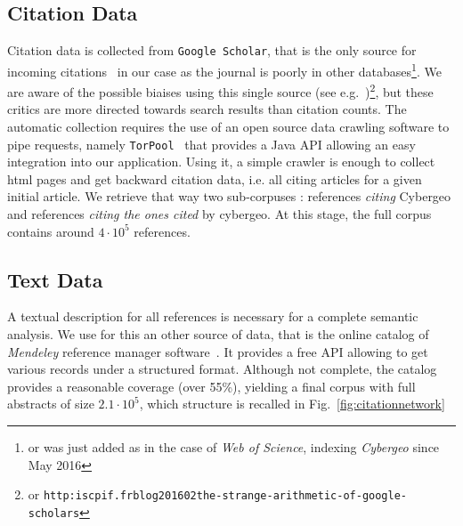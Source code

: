 \subsection*{Citation Data}

Citation data is collected from \texttt{Google Scholar}, that is the only source for incoming citations~\cite{noruzi2005google} in our case as the journal is poorly in other databases\footnote{or was just added as in the case of \textit{Web of Science}, indexing \textit{Cybergeo} since May 2016}. We are aware of the possible biaises using this single source (see e.g.~\cite{bohannon2014scientific})\footnote{or \texttt{http:\/\/iscpif.fr\/blog\/2016\/02\/the-strange-arithmetic-of-google-scholars}}, but these critics are more directed towards search results than citation counts. The automatic collection requires the use of an open source data crawling software to pipe requests, namely \texttt{TorPool}~\cite{} %
 that provides a Java API allowing an easy integration into our application. Using it, a simple crawler is enough to collect html pages and get backward citation data, i.e. all citing articles for a given initial article. We retrieve that way two sub-corpuses : references \emph{citing} Cybergeo and references \emph{citing the ones cited} by cybergeo. At this stage, the full corpus contains around $4\cdot10^5$ references.


\subsection*{Text Data}


A textual description for all references is necessary for a complete semantic analysis. We use for this an other source of data, that is the online catalog of \textit{Mendeley} reference manager software~\cite{mendeley}. It provides a free API allowing to get various records under a structured format. Although not complete, the catalog provides a reasonable coverage (over 55\%), yielding a final corpus with full abstracts of size $2.1\cdot 10^5$, which structure is recalled in Fig.~\ref{fig:citationnetwork}



